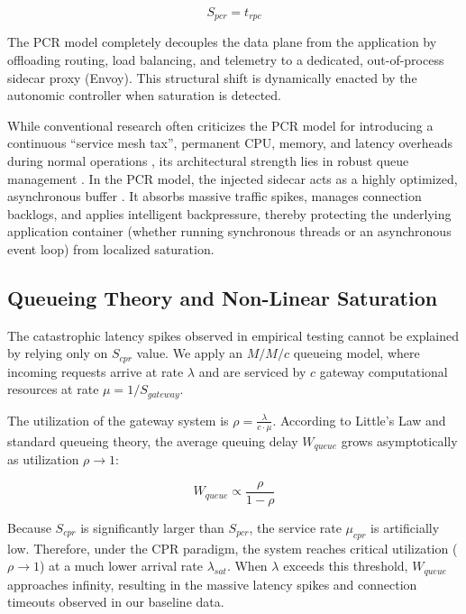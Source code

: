 \documentclass{ieeeaccess}
\begin{document}
\begin{equation}
    S_{pcr} = t_{rpc}
\end{equation}



The PCR model completely decouples the data plane from the application by offloading routing, load balancing, and telemetry to a dedicated, out-of-process sidecar proxy (Envoy). This structural shift is dynamically enacted by the autonomic controller when saturation is detected.

While conventional research often criticizes the PCR model for introducing a continuous ``service mesh tax'', permanent CPU, memory, and latency overheads during normal operations \cite{chen2025trade,zhang2026adaptive}, its architectural strength lies in robust queue management \cite{xiang2024cost}. In the PCR model, the injected sidecar acts as a highly optimized, asynchronous buffer \cite{santos2018analyzing}. It absorbs massive traffic spikes, manages connection backlogs, and applies intelligent backpressure, thereby protecting the underlying application container (whether running synchronous threads or an asynchronous event loop) from localized saturation.

\subsection{Queueing Theory and Non-Linear Saturation}
\label{sec2.3}

The catastrophic latency spikes observed in empirical testing cannot be explained by relying only on $S_{cpr}$ value. We apply an $M/M/c$ queueing model, where incoming requests arrive at rate $\lambda$ and are serviced by $c$ gateway computational resources at rate $\mu = 1/S_{gateway}$.

The utilization of the gateway system is $\rho = \frac{\lambda}{c \cdot \mu}$. According to Little's Law \cite{little2011or} and standard queueing theory, the average queuing delay $W_{queue}$ grows asymptotically as utilization $\rho \to 1$:

\begin{equation}
    W_{queue} \propto \frac{\rho}{1 - \rho}
\end{equation}

Because $S_{cpr}$ is significantly larger than $S_{pcr}$, the service rate $\mu_{cpr}$ is artificially low. Therefore, under the CPR paradigm, the system reaches critical utilization ($\rho \to 1$) at a much lower arrival rate $\lambda_{sat}$. When $\lambda$ exceeds this threshold, $W_{queue}$ approaches infinity, resulting in the massive latency spikes and connection timeouts observed in our baseline data.
\end{document}
